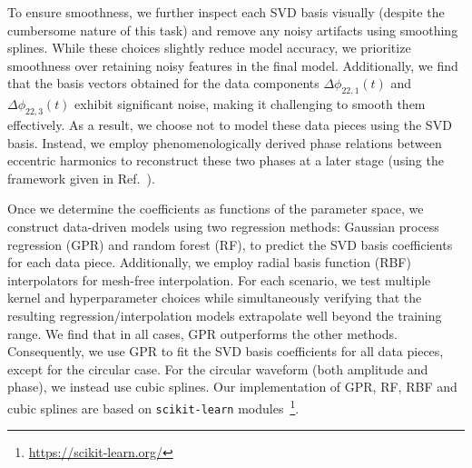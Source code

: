 \documentclass[aps,prd,amsmath,floats,floatfix, twocolumn,
superscriptaddress,nofootinbib,showpacs,longbibliography]{revtex4-1}
\begin{document}
To ensure smoothness, we further inspect each SVD basis visually (despite the cumbersome nature of this task) and remove any noisy artifacts using smoothing splines. While these choices slightly reduce model accuracy, we prioritize smoothness over retaining noisy features in the final model. 
Additionally, we find that the basis vectors obtained for the data components $\Delta \phi_{22,1}(t)$ and $\Delta \phi_{22,3}(t)$ exhibit significant noise, making it challenging to smooth them effectively. As a result, we choose not to model these data pieces using the SVD basis. Instead, we employ phenomenologically derived phase relations between eccentric harmonics to reconstruct these two phases at a later stage (using the framework given in Ref.~\cite{Islam2025InPrep}).

Once we determine the coefficients as functions of the parameter space, we construct data-driven models using two regression methods: Gaussian process regression (GPR) and random forest (RF), to predict the SVD basis coefficients for each data piece. Additionally, we employ radial basis function (RBF) interpolators for mesh-free interpolation. 
For each scenario, we test multiple kernel and hyperparameter choices while simultaneously verifying that the resulting regression/interpolation models extrapolate well beyond the training range. We find that in all cases, GPR outperforms the other methods. Consequently, we use GPR to fit the SVD basis coefficients for all data pieces, except for the circular case. For the circular waveform (both amplitude and phase), we instead use cubic splines.
Our implementation of GPR, RF, RBF and cubic splines are based on \texttt{scikit-learn} modules~\footnote{\href{https://scikit-learn.org/}{https://scikit-learn.org/}}.
\end{document}
